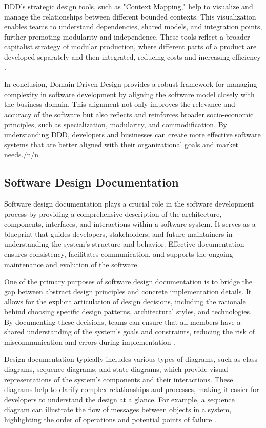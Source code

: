 \begin{refsection}
DDD’s strategic design tools, such as "Context Mapping," help to visualize and manage the relationships between different bounded contexts. This visualization enables teams to understand dependencies, shared models, and integration points, further promoting modularity and independence. These tools reflect a broader capitalist strategy of modular production, where different parts of a product are developed separately and then integrated, reducing costs and increasing efficiency \cite[pp.~140-143]{Evans2004}.

In conclusion, Domain-Driven Design provides a robust framework for managing complexity in software development by aligning the software model closely with the business domain. This alignment not only improves the relevance and accuracy of the software but also reflects and reinforces broader socio-economic principles, such as specialization, modularity, and commodification. By understanding DDD, developers and businesses can create more effective software systems that are better aligned with their organizational goals and market needs./n/n\subsection{Software Design Documentation}

Software design documentation plays a crucial role in the software development process by providing a comprehensive description of the architecture, components, interfaces, and interactions within a software system. It serves as a blueprint that guides developers, stakeholders, and future maintainers in understanding the system's structure and behavior. Effective documentation ensures consistency, facilitates communication, and supports the ongoing maintenance and evolution of the software.

One of the primary purposes of software design documentation is to bridge the gap between abstract design principles and concrete implementation details. It allows for the explicit articulation of design decisions, including the rationale behind choosing specific design patterns, architectural styles, and technologies. By documenting these decisions, teams can ensure that all members have a shared understanding of the system's goals and constraints, reducing the risk of miscommunication and errors during implementation \cite[pp.~123-126]{Pfleeger2006}.

Design documentation typically includes various types of diagrams, such as class diagrams, sequence diagrams, and state diagrams, which provide visual representations of the system's components and their interactions. These diagrams help to clarify complex relationships and processes, making it easier for developers to understand the design at a glance. For example, a sequence diagram can illustrate the flow of messages between objects in a system, highlighting the order of operations and potential points of failure \cite[pp.~45-48]{Fowler2004}.


\end{refsection}
